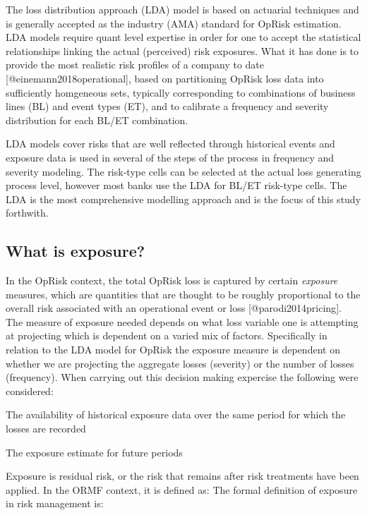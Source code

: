 \documentclass[
]{article}
\begin{document}
The loss distribution approach (LDA) model is based on actuarial
techniques and is generally accepted as the industry (AMA) standard for
OpRisk estimation. LDA models require quant level expertise in order for
one to accept the statistical relationships linking the actual
(perceived) risk exposures. What it has done is to provide the most
realistic risk profiles of a company to date
{[}@einemann2018operational{]}, based on partitioning OpRisk loss data
into sufficiently homgeneous sets, typically corresponding to
combinations of business lines (BL) and event types (ET), and to
calibrate a frequency and severity distribution for each BL/ET
combination.\medskip

LDA models cover risks that are well reflected through historical events
and exposure data is used in several of the steps of the process in
frequency and severity modeling. The risk-type cells can be selected at
the actual loss generating process level, however most banks use the LDA
for BL/ET risk-type cells. The LDA is the most comprehensive modelling
approach and is the focus of this study forthwith. \medskip

\subsection{What is exposure?}
\label{sec:What is exposure?}

In the OpRisk context, the total OpRisk loss is captured by certain
\emph{exposure} measures, which are quantities that are thought to be
roughly proportional to the overall risk associated with an operational
event or loss {[}@parodi2014pricing{]}. The measure of exposure needed
depends on what loss variable one is attempting at projecting which is
dependent on a varied mix of factors. Specifically in relation to the
LDA model for OpRisk the exposure measure is dependent on whether we are
projecting the aggregate losses (severity) or the number of losses
(frequency). When carrying out this decision making expercise the
following were considered:

\begin{list}{*}{}
\item The availability of historical exposure data over the same period for which the losses are recorded
\item The exposure estimate for future periods
\end{list}
\medskip

Exposure is residual risk, or the risk that remains after risk
treatments have been applied. In the ORMF context, it is defined as: The
formal definition of exposure in risk management is:
\end{document}
